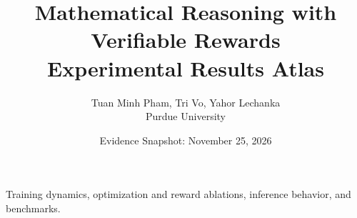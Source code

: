 \documentclass[10pt,letterpaper]{article}
\title{Mathematical Reasoning with Verifiable Rewards\\Experimental Results Atlas}
\author{Tuan Minh Pham, Tri Vo, Yahor Lechanka\\Purdue University}
\date{Evidence Snapshot: November 25, 2026}
\begin{document}
\maketitle
\begin{center}
Training dynamics, optimization and reward ablations, inference behavior, and benchmarks.
\end{center}

\end{document}
